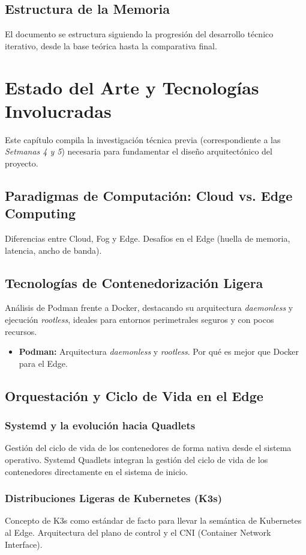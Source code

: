 \documentclass[11pt, a4paper]{report}
\begin{document}
\section{Estructura de la Memoria}
El documento se estructura siguiendo la progresión del desarrollo técnico iterativo, desde la base teórica hasta la comparativa final.

\chapter{Estado del Arte y Tecnologías Involucradas}

Este capítulo compila la investigación técnica previa (correspondiente a las \textit{Setmanas 4 y 5}) necesaria para fundamentar el diseño arquitectónico del proyecto.

\section{Paradigmas de Computación: Cloud vs. Edge Computing}
Diferencias entre Cloud, Fog y Edge. Desafíos en el Edge (huella de memoria, latencia, ancho de banda).

\section{Tecnologías de Contenedorización Ligera}
Análisis de Podman frente a Docker, destacando su arquitectura \textit{daemonless} y ejecución \textit{rootless}, ideales para entornos perimetrales seguros y con pocos recursos.
\begin{itemize}
    \item \textbf{Podman:} Arquitectura \textit{daemonless} y \textit{rootless}. Por qué es mejor que Docker para el Edge.
\end{itemize}

\section{Orquestación y Ciclo de Vida en el Edge}
\subsection{Systemd y la evolución hacia Quadlets}
Gestión del ciclo de vida de los contenedores de forma nativa desde el sistema operativo. Systemd Quadlets integran la gestión del ciclo de vida de los contenedores directamente en el sistema de inicio.
\subsection{Distribuciones Ligeras de Kubernetes (K3s)}
Concepto de K3s como estándar de facto para llevar la semántica de Kubernetes al Edge. Arquitectura del plano de control y el CNI (Container Network Interface).
\end{document}

